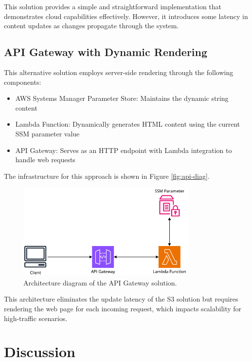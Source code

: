 \documentclass{article}
\begin{document}
This solution provides a simple and straightforward implementation that demonstrates cloud capabilities effectively. However, it introduces some latency in content updates as changes propagate through the system.

\subsection{API Gateway with Dynamic Rendering}

This alternative solution employs server-side rendering through the following components:

\begin{itemize}
    \item AWS Systems Manager Parameter Store: Maintains the dynamic string content
    \item Lambda Function: Dynamically generates HTML content using the current SSM parameter value
    \item API Gateway: Serves as an HTTP endpoint with Lambda integration to handle web requests
\end{itemize}

The infrastructure for this approach is shown in Figure \autoref{fig:api-diag}.

\begin{figure}[h]
\centering
\includegraphics[width=0.8\textwidth]{api-solution.png}
\caption{Architecture diagram of the API Gateway solution.}
\label{fig:api-diag}
\end{figure}

This architecture eliminates the update latency of the S3 solution but requires rendering the web page for each incoming request, which impacts scalability for high-traffic scenarios.

\section{Discussion}
\end{document}
